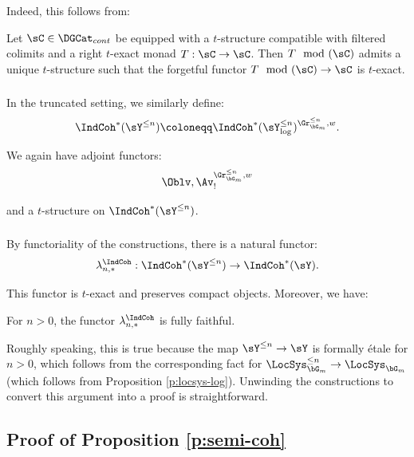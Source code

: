 Indeed, this follows from:

\begin{lem}
\notready

Let $\sC \in \DGCat_{cont}$ be equipped with a $t$-structure compatible with
filtered colimits and a right $t$-exact monad $T:\sC \to \sC$.
Then $T\mod(\sC)$ admits a unique $t$-structure such that the
forgetful functor $T\mod(\sC) \to \sC$ is $t$-exact.

\end{lem}

\subsubsection{}\label{ss:y-trun-indcoh}

In the truncated setting, we similarly define:
%
\[
\IndCoh^*(\sY^{\leq n}) \coloneqq
\IndCoh^*(\sY_{\log}^{\leq n})^{\Gr_{\bG_m}^{\leq n},w}.
\]

 We again have adjoint functors:
%
\[
\Oblv,\Av_!^{\Gr_{\bG_m}^{\leq n},w}
\]

 and a $t$-structure on $\IndCoh^*(\sY^{\leq n})$.

\subsubsection{}

By functoriality of the constructions, there is a natural functor:
%
\[
\lambda_{n,*}^{\IndCoh}:\IndCoh^*(\sY^{\leq n}) \to \IndCoh^*(\sY).
\]

 This functor is $t$-exact and preserves compact objects. Moreover, we have:

\begin{lem}
\notready\label{l:lambda-ff}

For $n>0$, the functor $\lambda_{n,*}^{\IndCoh}$ is fully faithful.

\end{lem}

Roughly speaking, this is true because the map $\sY^{\leq n} \to \sY$ is
formally \'etale for $n>0$, which follows from the corresponding
fact for $\LocSys_{\bG_m}^{\leq n} \to \LocSys_{\bG_m}$ (which
follows from Proposition \ref{p:locsys-log}). Unwinding the constructions
to convert this argument into a proof is straightforward.

\subsection{Proof of Proposition \ref{p:semi-coh}}\label{ss:z-semi-coh-pf}

